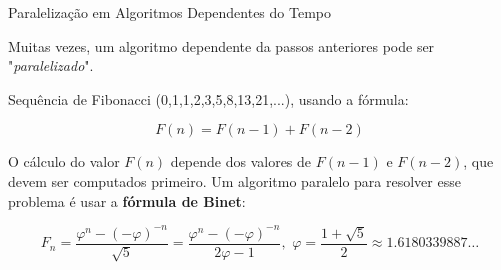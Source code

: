 \documentclass{beamer}
\begin{document}
	\begin{frame}{Paralelização em Algoritmos Dependentes do Tempo}
		
		Muitas vezes, um algoritmo dependente da passos anteriores pode ser "\emph{paralelizado}".
		
		\vspace{0.2cm}
		 Sequência de Fibonacci (0,1,1,2,3,5,8,13,21,...),  usando a fórmula:
		
		\[
		F(n) = F(n-1) + F(n-2)
		\]
		
		O cálculo do valor \(F(n)\) depende dos valores de \(F(n-1)\) e \(F(n-2)\), que devem ser computados primeiro. Um algoritmo paralelo para resolver esse problema é usar a \textbf{fórmula de Binet}:
		
		\[
		F_n = \frac{\varphi^n - (-\varphi)^{-n}}{\sqrt{5}} = \frac{\varphi^n - (-\varphi)^{-n}}{2\varphi - 1},\,\,
		\varphi = \frac{1 + \sqrt{5}}{2} \approx 1.61803 39887\ldots
		\]
		
	\end{frame}
	
\end{document}
